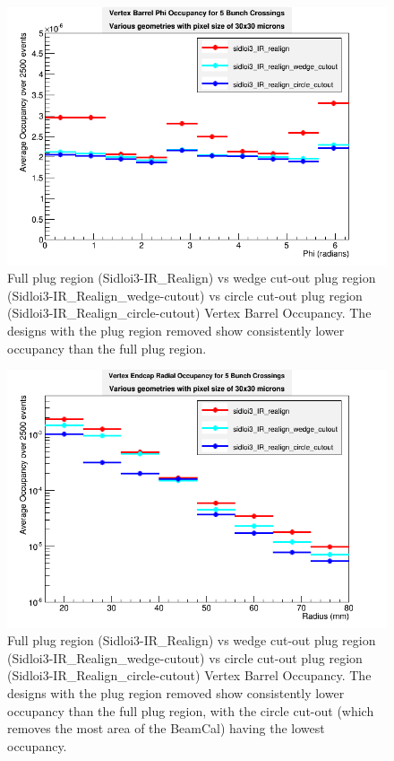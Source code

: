 \documentclass{report}
\begin{document}
                \begin{figure}[H] 
                    \includegraphics[height=.4\textheight]{VradOccupancy_plug_brl}
                    \centering
                    \caption{Full plug region (Sidloi3-IR\_Realign) vs wedge cut-out plug region
                            (Sidloi3-IR\_Realign\_wedge-cutout) vs circle cut-out plug region
                            (Sidloi3-IR\_Realign\_circle-cutout)  Vertex Barrel Occupancy. 
                            The designs with the plug region removed show consistently lower
                            occupancy than the full plug region.}
                    \label{fig__plug_vertex_brl}
                \end{figure}
                \begin{figure}[H] 
                    \includegraphics[height=.4\textheight]{VradOccupancy_plug_ecp}
                    \centering
                    \caption{Full plug region (Sidloi3-IR\_Realign) vs wedge cut-out plug region
                            (Sidloi3-IR\_Realign\_wedge-cutout) vs circle cut-out plug region
                            (Sidloi3-IR\_Realign\_circle-cutout)  Vertex Barrel Occupancy. 
                            The designs with the plug region removed show consistently lower
                            occupancy than the full plug region, with the circle cut-out (which 
                            removes the most area of the BeamCal) having the lowest occupancy.}
                    \label{fig__plug_vertex_ecp}
                \end{figure}
\end{document}
